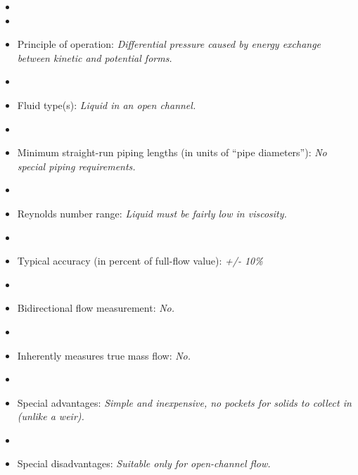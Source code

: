 \begin{itemize}
\goodbreak
\item{} 
\vskip 5pt
\item\item{} Principle of operation: {\it Differential pressure caused by energy exchange between kinetic and potential forms.}
\vskip 5pt
\item\item{} Fluid type(s): {\it Liquid in an open channel.}
\vskip 5pt
\item\item{} Minimum straight-run piping lengths (in units of ``pipe diameters''): {\it No special piping requirements.}
\vskip 5pt
\item\item{} Reynolds number range: {\it Liquid must be fairly low in viscosity.}
\vskip 5pt
\item\item{} Typical accuracy (in percent of full-flow value): {\it +/- 10\%}
\vskip 5pt
\item\item{} Bidirectional flow measurement: {\it No.}
\vskip 5pt
\item\item{} Inherently measures true mass flow: {\it No.}
\vskip 5pt
\item\item{} Special advantages: {\it Simple and inexpensive, no pockets for solids to collect in (unlike a weir).}
\vskip 5pt
\item\item{} Special disadvantages: {\it Suitable only for open-channel flow.}
\end{itemize}











